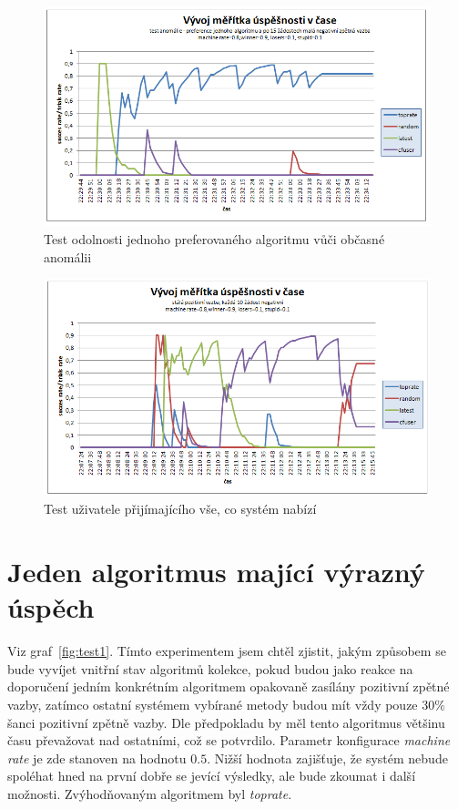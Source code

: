 \documentclass[thesis=M,czech]{FITthesis}[2014/05/07]
\begin{document}
\begin{figure}\centering
	\includegraphics[width=1.0\textwidth]{obr/experimenty/test9_1.png}
 	\caption[Test odolnosti jednoho preferovaného algoritmu vůči občasné anomálii]{Test odolnosti jednoho preferovaného algoritmu vůči občasné anomálii}\label{fig:test9_1}
\end{figure}	

\begin{figure}\centering
	\includegraphics[width=1.0\textwidth]{obr/experimenty/test8_2.png}
 	\caption[Test uživatele přijímajícího vše, co systém nabízí]{Test uživatele přijímajícího vše, co systém nabízí}\label{fig:test8_2}
\end{figure}	

\section{Jeden algoritmus mající výrazný úspěch}
Viz graf~\ref{fig:test1}. Tímto experimentem jsem chtěl zjistit, jakým způsobem se bude vyvíjet vnitřní stav algoritmů kolekce, pokud budou jako reakce na doporučení jedním konkrétním algoritmem opakovaně zasílány pozitivní zpětné vazby, zatímco ostatní systémem vybírané metody budou mít vždy pouze 30\% šanci pozitivní zpětně vazby. Dle předpokladu by měl tento algoritmus většinu času převažovat nad ostatními, což se potvrdilo. Parametr konfigurace \emph{machine rate} je zde stanoven na hodnotu $0.5$. Nižší hodnota zajišťuje, že systém nebude spoléhat hned na první dobře se jevící výsledky, ale bude zkoumat i další možnosti. Zvýhodňovaným algoritmem byl \emph{toprate}.
\end{document}
